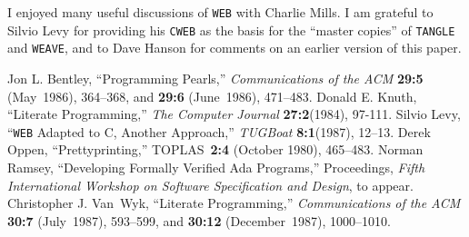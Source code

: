 \medskip

I enjoyed many useful discussions of {\tt WEB} with Charlie Mills.
I am grateful to
Silvio Levy for providing his {\tt CWEB} as the basis for the
``master copies'' of {\tt TANGLE} and {\tt WEAVE}, and to
Dave Hanson for comments on an earlier version of this paper.

\begin{thebibliography}{van~Knuth~999}
Jon L. Bentley, ``Programming Pearls,''
{\sl Communications of the ACM} {\bf 29:5} (May~1986), 364--368, and
{\bf 29:6} (June~1986), 471--483.
Donald E. Knuth, ``Literate Programming,'' {\sl The Computer Journal}
{\bf 27:2}(1984), 97-111.
Silvio Levy, ``{\tt WEB} Adapted to C, Another Approach,''
 {\sl TUGBoat} {\bf 8:1}(1987), 12--13.
Derek Oppen, ``Prettyprinting,'' TOPLAS~{\bf 2:4} (October 1980),
465--483. 
Norman Ramsey, ``Developing Formally Verified Ada Programs,''
Proceedings, {\sl Fifth International Workshop on Software
Specification and Design}, to appear.
Christopher J. Van~Wyk, ``Literate Programming,''
{\sl Communications of the ACM} {\bf 30:7} (July~1987), 593--599, and
{\bf 30:12} (December~1987), 1000--1010.
\end{thebibliography}


